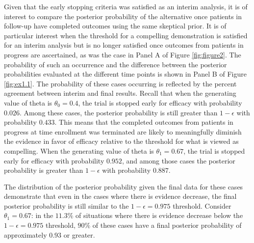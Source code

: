 \documentclass[AMA,STIX1COL,doublespace]{WileyNJD-v2}
\begin{document}
Given that the early stopping criteria was satisfied as an interim analysis, it is of interest to compare the posterior probability of the alternative once patients in follow-up have completed outcomes using the same skeptical prior.
%
It is of particular interest when the threshold for a compelling demonstration is satisfied for an interim analysis but is no longer satisfied once outcomes from patients in progress are ascertained, as was the case in Panel A of Figure \ref{fig:figure2}.
%
The probability of such an occurrence and the difference between the posterior probabilities evaluated at the different time points is shown in Panel B of Figure \ref{fig:ex1.1}.
%
The probability of these cases occurring is reflected by the percent agreement between interim and final results.
%
Recall that when the generating value of theta is $\theta_0=0.4$, the trial is stopped early for efficacy with probability $0.026$. Among these cases, the posterior probability is still greater than $1-\epsilon$ with probability $0.433$. 
%
This means that the completed outcomes from patients in progress at time enrollment was terminated are likely to meaningfully diminish the evidence in favor of efficacy relative to the threshold for what is viewed as compelling.
%
When the generating value of theta is $\theta_1=0.67$, the trial is stopped early for efficacy with probability $0.952$, and among those cases the posterior probability is  greater than $1-\epsilon$ with probability $0.887$.

The distribution of the posterior probability given the final data for these cases demonstrate that even in the cases where there is evidence decrease, the final posterior probability is still similar to the $1-\epsilon=0.975$ threshold.
%
Consider $\theta_1=0.67$: in the $11.3\%$ of situations where there is evidence decrease below the $1-\epsilon=0.975$ threshold, $90\%$ of these cases have a final posterior probability of approximately $0.93$ or greater. 
%
%
\end{document}

